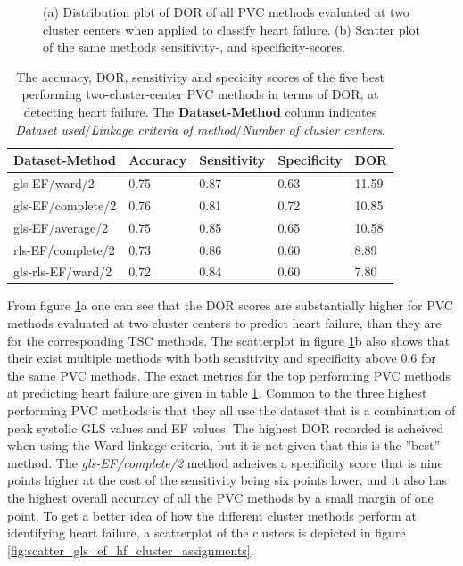 \begin{figure}[htb]
    \centering
    
    \caption{(a) Distribution plot of DOR of all PVC methods evaluated at two cluster centers when applied to classify heart failure.
             (b) Scatter plot of the same methods sensitivity-, and specificity-scores.}
    \label{fig:pvc_hf_dor_sens_spec_dist}
\end{figure}

\begin{table}[htb]
    \centering
    \begin{tabular}{p{3.5cm}p{1.5cm}p{1.65cm}p{1.65cm}p{1cm}}
        \toprule
        Dataset-Method    &  Accuracy &  Sensitivity &  Specificity &   DOR \\
        \midrule
        gls-EF/ward/2     &      0.75 &         0.87 &         0.63 & 11.59 \\
        gls-EF/complete/2 &      0.76 &         0.81 &         0.72 & 10.85 \\
        gls-EF/average/2  &      0.75 &         0.85 &         0.65 & 10.58 \\
        rls-EF/complete/2 &      0.73 &         0.86 &         0.60 &  8.89 \\
        gls-rls-EF/ward/2 &      0.72 &         0.84 &         0.60 &  7.80 \\
        \bottomrule
    \end{tabular}
    \caption{The accuracy, DOR, sensitivity and specicity scores of the five best performing two-cluster-center PVC methods in terms of DOR, at detecting heart failure.
             The \textbf{Dataset-Method} column indicates \textit{Dataset used}$/$\textit{Linkage criteria of method}$/$\textit{Number of cluster centers}.}
    \label{tab:pvc_hf_dor_sens_spec_dist}
\end{table}

From figure \ref{fig:pvc_hf_dor_sens_spec_dist}a one can see that the DOR scores are substantially higher for PVC methods evaluated at two cluster centers to predict heart failure, 
than they are for the corresponding TSC methods. 
The scatterplot in figure \ref{fig:pvc_hf_dor_sens_spec_dist}b also shows that their exist multiple methods with both sensitivity and specificity above $0.6$ for the same PVC methods.
The exact metrics for the top performing PVC methods at predicting heart failure are given in table \ref{tab:pvc_hf_dor_sens_spec_dist}.
Common to the three highest performing PVC methods is that they all use the dataset that is a combination of peak systolic GLS values and EF values.
The highest DOR recorded is acheived when using the Ward linkage criteria, but it is not given that this is the ''best'' method.
The \textit{gls-EF/complete/2} method acheives a specificity score that is nine points higher at the cost of the sensitivity being six points lower, 
and it also has the highest overall accuracy of all the PVC methods by a small margin of one point. 
To get a better idea of how the different cluster methods perform at identifying heart failure, a scatterplot of the clusters is depicted in figure 
\ref{fig:scatter_gls_ef_hf_cluster_assignments}. \bigskip

